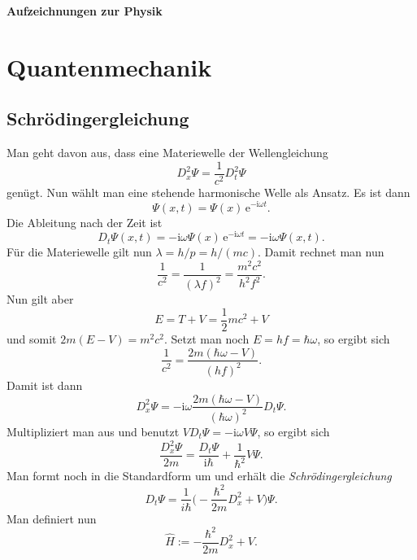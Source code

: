 \documentclass[a4paper,10pt,fleqn,twocolumn,twoside]{scrartcl}
\numberwithin{equation}{section}
\newcommand{\ui}{\mathrm i}
\newcommand{\ee}{\mathrm e}
\begin{document}
\noindent
{\LARGE\sffamily\bfseries Aufzeichnungen zur Physik}
\tableofcontents

\section{Quantenmechanik}
\subsection{Schrödingergleichung}

Man geht davon aus, dass eine Materiewelle der Wellengleichung
\begin{equation}
D_x^2\Psi = \frac{1}{c^2}D_t^2\Psi
\end{equation}
genügt. Nun wählt man eine stehende harmonische Welle als Ansatz.
Es ist dann
\begin{equation}
\Psi(x,t) = \Psi(x)\,\ee^{-\ui\omega t}.
\end{equation}
Die Ableitung nach der Zeit ist
\begin{equation}
D_t\Psi(x,t) = -\ui\omega\Psi(x)\,\ee^{-\ui\omega t}
= -\ui\omega\Psi(x,t).
\end{equation}
Für die Materiewelle gilt nun $\lambda=h/p=h/(mc)$. Damit rechnet
man nun
\begin{equation}
\frac{1}{c^2} = \frac{1}{(\lambda f)^2}
= \frac{m^2 c^2}{h^2 f^2}.
\end{equation}
Nun gilt aber
\begin{equation}
E=T+V=\frac{1}{2}mc^2+V
\end{equation}
und somit $2m(E-V)=m^2 c^2$. Setzt man noch $E=hf=\hbar\omega$,
so ergibt sich
\begin{equation}
\frac{1}{c^2} = \frac{2m(\hbar\omega-V)}{(hf)^2}.
\end{equation}
Damit ist dann
\begin{equation}
D_x^2\Psi
= -\ui\omega\frac{2m(\hbar\omega-V)}{(\hbar\omega)^2}D_t\Psi.
\end{equation}
Multipliziert man aus und benutzt $VD_t\Psi=-\ui\omega V\Psi$,
so ergibt sich
\begin{equation}
\frac{D_x^2\Psi}{2m}
= \frac{D_t\Psi}{\ui\hbar}+\frac{1}{\hbar^2}V\Psi.
\end{equation}
Man formt noch in die Standardform um und erhält die
\emph{Schrödingergleichung}
\begin{equation}
D_t\Psi = \frac{1}{i\hbar}\Big(-\frac{\hbar^2}{2m}D_x^2+V\Big)\Psi.
\end{equation}
Man definiert nun
\begin{equation}
\hat H := -\frac{\hbar^2}{2m}D_x^2+V.
\end{equation}
\end{document}
